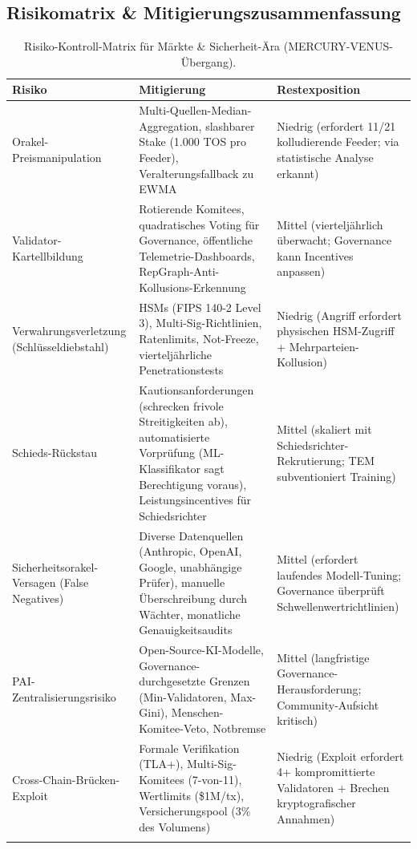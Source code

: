 \documentclass[11pt]{article}
\begin{document}
\subsection{Risikomatrix \& Mitigierungszusammenfassung}
\begin{longtable}{@{}p{}p{}p{}@{}}
\toprule
\textbf{Risiko} & \textbf{Mitigierung} & \textbf{Restexposition} \\\midrule
Orakel-Preismanipulation & Multi-Quellen-Median-Aggregation, slashbarer Stake (1.000 TOS pro Feeder), Veralterungsfallback zu EWMA & Niedrig (erfordert 11/21 kolludierende Feeder; via statistische Analyse erkannt) \\
Validator-Kartellbildung & Rotierende Komitees, quadratisches Voting für Governance, öffentliche Telemetrie-Dashboards, RepGraph-Anti-Kollusions-Erkennung & Mittel (vierteljährlich überwacht; Governance kann Incentives anpassen) \\
Verwahrungsverletzung (Schlüsseldiebstahl) & HSMs (FIPS 140-2 Level 3), Multi-Sig-Richtlinien, Ratenlimits, Not-Freeze, vierteljährliche Penetrationstests & Niedrig (Angriff erfordert physischen HSM-Zugriff + Mehrparteien-Kollusion) \\
Schieds-Rückstau & Kautionsanforderungen (schrecken frivole Streitigkeiten ab), automatisierte Vorprüfung (ML-Klassifikator sagt Berechtigung voraus), Leistungsincentives für Schiedsrichter & Mittel (skaliert mit Schiedsrichter-Rekrutierung; TEM subventioniert Training) \\
Sicherheitsorakel-Versagen (False Negatives) & Diverse Datenquellen (Anthropic, OpenAI, Google, unabhängige Prüfer), manuelle Überschreibung durch Wächter, monatliche Genauigkeitsaudits & Mittel (erfordert laufendes Modell-Tuning; Governance überprüft Schwellenwertrichtlinien) \\
PAI-Zentralisierungsrisiko & Open-Source-KI-Modelle, Governance-durchgesetzte Grenzen (Min-Validatoren, Max-Gini), Menschen-Komitee-Veto, Notbremse & Mittel (langfristige Governance-Herausforderung; Community-Aufsicht kritisch) \\
Cross-Chain-Brücken-Exploit & Formale Verifikation (TLA+), Multi-Sig-Komitees (7-von-11), Wertlimits (\$1M/tx), Versicherungspool (3\% des Volumens) & Niedrig (Exploit erfordert 4+ kompromittierte Validatoren + Brechen kryptografischer Annahmen) \\\bottomrule
\caption{Risiko-Kontroll-Matrix für Märkte \& Sicherheit-Ära (MERCURY-VENUS-Übergang).}
\label{tab:risk-markets-expanded}
\end{longtable}
\end{document}
